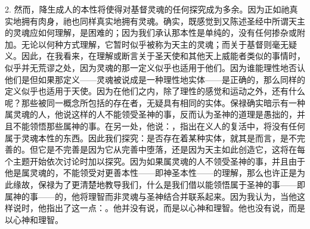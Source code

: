 2. 然而，降生成人的本性将使得对基督灵魂的任何探究成为多余。因为正如祂真实地拥有肉身，祂也同样真实地拥有灵魂。确实，既感觉到又陈述圣经中所谓天主的灵魂应如何理解，是困难的；因为我们承认那本性是单纯的，没有任何掺杂或附加。无论以何种方式理解，它暂时似乎被称为天主的灵魂；而关于基督则毫无疑义。因此，在我看来，在理解或断言关于圣天使和其他天上威能者类似的事情时，似乎并无荒谬之处，因为灵魂的那一定义似乎也适用于他们。因为谁能理性地否认他们是但如果那定义——灵魂被说成是一种理性地实体——是正确的，那么同样的定义似乎也适用于天使。因为在他们之内，除了理性的感觉和运动之外，还有什么呢？那些被同一概念所包括的存在者，无疑具有相同的实体。保禄确实暗示有一种属灵魂的人，他说这样的人不能领受圣神的事，反而认为圣神的道理是愚拙的，并且不能领悟那些属神的事。在另一处，他说：，指出在义人的复活中，将没有任何属于灵魂本性的东西。因此我们探究：是否存在着某种实体，就其是而言，是不完善的。但它是不完善是因为它从完善中堕落，还是因为天主如此创造它，这将在每个主题开始依次讨论时加以探究。因为如果属灵魂的人不领受圣神的事，并且由于他是属灵魂的，不能领受对更善本性——即神圣本性——的理解，那么也许正是为此缘故，保禄为了更清楚地教导我们，什么是我们借以能领悟属于圣神的事——即属神的事——的，他将理智而非灵魂与圣神结合并联系起来。因为我认为，当他这样说时，他指出了这一点：。他并没有说，而是以心神和理智。他也没有说，而是以心神和理智。\par

